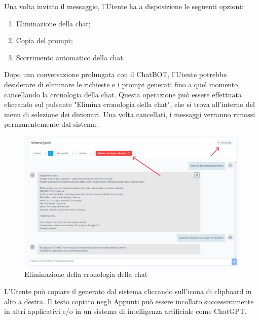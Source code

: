 \par Una volta inviato il messaggio, l'Utente ha a disposizione le seguenti opzioni:
\begin{enumerate}
  \item Eliminazione della chat;
  \item Copia del prompt;
  \item Scorrimento automatico della chat.
\end{enumerate}


\par Dopo una conversazione prolungata con il ChatBOT, l'Utente potrebbe desiderare di eliminare le richieste e i prompt generati fino a quel momento, cancellando la cronologia della chat. Questa operazione può essere effettuata cliccando sul pulsante "Elimina cronologia della chat", che si trova all'interno del menu di selezione dei dizionari. Una volta cancellati, i messaggi verranno rimossi permanentemente dal sistema.

\begin{figure}[H]
  \centering
  \includegraphics[width=\textwidth]{assets/elimina_chat.png}
  \caption{Eliminazione della cronologia della chat}
\end{figure}


\par L'Utente può copiare il  generato dal sistema cliccando sull'icona di clipboard in alto a destra. Il testo copiato negli Appunti può essere incollato successivamente in altri applicativi e/o in un sistema di intelligenza artificiale come ChatGPT.

